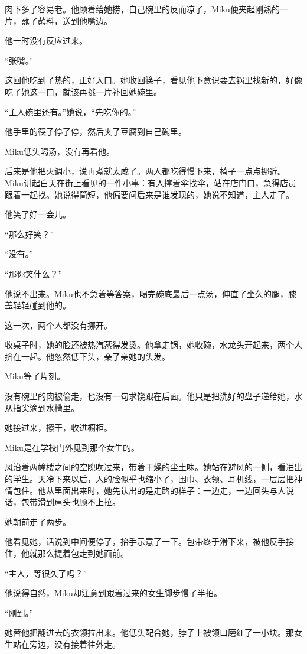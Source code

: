 肉下多了容易老。他顾着给她捞，自己碗里的反而凉了，Miku便夹起刚熟的一片，蘸了蘸料，送到他嘴边。

他一时没有反应过来。

“张嘴。”

这回他吃到了热的，正好入口。她收回筷子，看见他下意识要去锅里找新的，好像吃了她这一口，就该再挑一片补回她碗里。

“主人碗里还有。”她说，“先吃你的。”

他手里的筷子停了停，然后夹了豆腐到自己碗里。

Miku低头喝汤，没有再看他。

后来是他把火调小，说再煮就太咸了。两人都吃得慢下来，椅子一点点挪近。Miku讲起白天在街上看见的一件小事：有人撑着伞找伞，站在店门口，急得店员跟着一起找。她说得简短，他偏要问后来是谁发现的，她说不知道，主人走了。

他笑了好一会儿。

“那么好笑？”

“没有。”

“那你笑什么？”

他说不出来。Miku也不急着等答案，喝完碗底最后一点汤，伸直了坐久的腿，膝盖轻轻碰到他的。

这一次，两个人都没有挪开。

收桌子时，她的脸还被热汽蒸得发烫。他拿走锅，她收碗，水龙头开起来，两个人挤在一起。他忽然低下头，亲了亲她的头发。

Miku等了片刻。

没有碗里的肉被偷走，也没有一句求饶跟在后面。他只是把洗好的盘子递给她，水从指尖滴到水槽里。

她接过来，擦干，收进橱柜。

\SceneBreak

Miku是在学校门外见到那个女生的。

风沿着两幢楼之间的空隙吹过来，带着干燥的尘土味。她站在避风的一侧，看进出的学生。天冷下来以后，人的脸似乎也缩小了，围巾、衣领、耳机线，一层层把神情包住。他从里面出来时，她先认出的是走路的样子：一边走，一边回头与人说话，包带滑到肩头也顾不上拉。

她朝前走了两步。

他看见她，话说到中间便停了，抬手示意了一下。包带终于滑下来，被他反手接住，他就那么提着包走到她面前。

“主人，等很久了吗？”

他说得自然，Miku却注意到跟着过来的女生脚步慢了半拍。

“刚到。”

她替他把翻进去的衣领拉出来。他低头配合她，脖子上被领口磨红了一小块。那女生站在旁边，没有接着往外走。

